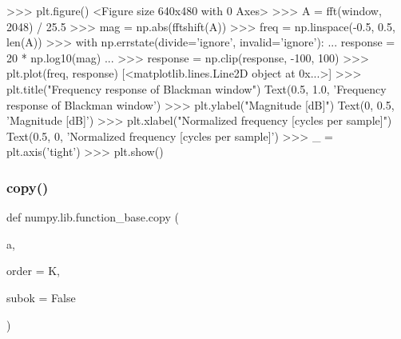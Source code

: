 \begin{DoxyVerb}
>>> plt.figure()
<Figure size 640x480 with 0 Axes>
>>> A = fft(window, 2048) / 25.5
>>> mag = np.abs(fftshift(A))
>>> freq = np.linspace(-0.5, 0.5, len(A))
>>> with np.errstate(divide='ignore', invalid='ignore'):
...     response = 20 * np.log10(mag)
...
>>> response = np.clip(response, -100, 100)
>>> plt.plot(freq, response)
[<matplotlib.lines.Line2D object at 0x...>]
>>> plt.title("Frequency response of Blackman window")
Text(0.5, 1.0, 'Frequency response of Blackman window')
>>> plt.ylabel("Magnitude [dB]")
Text(0, 0.5, 'Magnitude [dB]')
>>> plt.xlabel("Normalized frequency [cycles per sample]")
Text(0.5, 0, 'Normalized frequency [cycles per sample]')
>>> _ = plt.axis('tight')
>>> plt.show()\end{DoxyVerb}
 \mbox{\label{namespacenumpy_1_1lib_1_1function__base_aa46553d3b1207934de95320186e6d9f5}} 
\subsubsection{\texorpdfstring{copy()}{copy()}}
{\footnotesize\ttfamily def numpy.\+lib.\+function\+\_\+base.\+copy (\begin{DoxyParamCaption}\item[{}]{a,  }\item[{}]{order = {\ttfamily \textquotesingle{}K\textquotesingle{}},  }\item[{}]{subok = {\ttfamily False} }\end{DoxyParamCaption})}

